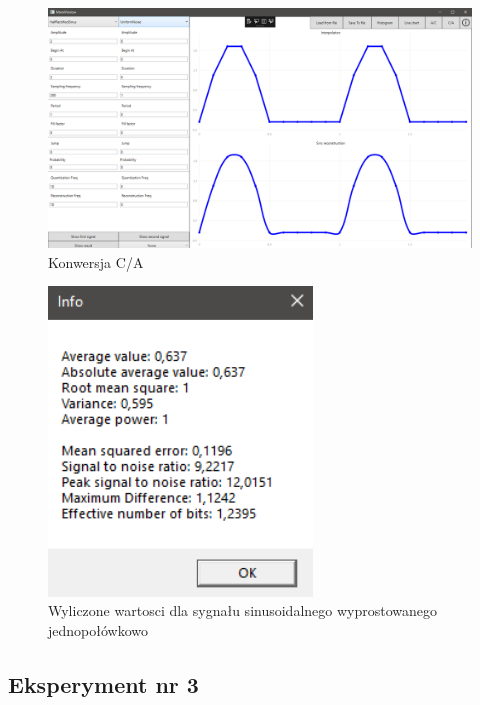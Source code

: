 \documentclass[12pt]{article}
\begin{document}
\begin{figure}[H]
 \centering
 \includegraphics[width=14cm]{images/hsinca.PNG}
 \vspace{-0.3cm}
 \caption{Konwersja C/A}
 \label{gui}
\end{figure}

\begin{figure}[H]
 \centering
 \includegraphics[width=7cm]{images/hsininfo.PNG}
 \vspace{-0.3cm}
 \caption{Wyliczone wartosci dla sygnału sinusoidalnego wyprostowanego jednopołówkowo}
 \label{gui}
\end{figure}





\subsection{Eksperyment nr 3 }
\end{document}
